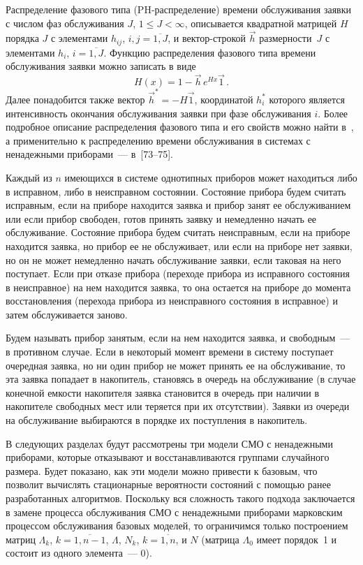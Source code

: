 \begin{multicols}{2}
Распределение фазового типа (PH-рас\-пре\-де\-ле\-ние) времени обслуживания
заявки с числом фаз обслуживания $J$, $1\le J <\infty$,
описывается квад\-рат\-ной матрицей $H$ порядка $J$ с элементами
$h_{ij}$,  $i,j=\overline{1,J}$, и вектор-строкой $\vec h$
размерности~$J$ с элементами $h_i$, $i=\overline{1,J}$.
Функцию распределения фазового типа
времени обслуживания заявки можно записать в виде
$$
H(x) = 1-\vec h\, e^{Hx} \vec1\,.
$$
Далее понадобится также вектор $\vec h^*= -H\vec1$, координатой
$h^*_i$ которого является интенсивность окончания обслуживания заявки
при фазе обслуживания $i$.
Более подробное описание распределения фазового типа и его свойств
можно найти в~\cite{BP95}, а применительно к распределению времени
обслуживания в системах с ненадежными приборами~--- в~[73--75].

Каждый из $n$ имеющихся в системе однотипных приборов может находиться
либо в исправном, либо в неисправном состоянии.
Состояние прибора будем считать исправным, если на приборе находится
заявка и прибор занят ее обслуживанием или если прибор свободен,
готов принять заявку и немедленно начать ее обслуживание.
Состояние прибора будем считать неисправным, если на приборе находится
заявка, но прибор ее не обслуживает, или если на приборе нет заявки,
но он не может немедленно начать обслуживание заявки, если таковая на него
поступает.
Если при отказе прибора (переходе прибора из исправного состояния в
неисправное) на нем находится заявка, то она остается на приборе до
момента восстановления (перехода прибора из неисправного состояния в
исправное) и затем обслуживается заново.

Будем называть прибор занятым, если на нем находится заявка, и
свободным~--- в противном случае.
Если в некоторый момент времени в систему поступает очередная заявка,
но ни один прибор не может принять ее на обслуживание, то эта заявка
попадает в накопитель, становясь в очередь на обслуживание (в случае
конечной емкости накопителя заявка становится в очередь при наличии
в накопителе свободных мест или теряется при их отсутствии).
Заявки из очереди на обслуживание выбираются в порядке их поступления
в накопитель.

В следующих разделах будут рассмотрены три модели СМО с ненадежными
приборами, которые отказывают и восстанавливаются группами случайного
размера.
Будет показано, как эти модели можно привести к базовым,
что позволит вычислять стационарные вероятности состояний с помощью
ранее разработанных алгоритмов.
Поскольку вся сложность такого подхода заключается в замене процесса
обслуживания СМО с ненадежными приборами марковским процессом
обслуживания базовых моделей, то ограничимся только
построением матриц $\Lambda_k$, $k=\overline{1,n-1}$,
$\Lambda$, $N_k$, $k=\overline{1,n}$, и $N$ (матрица $\Lambda_0$
имеет порядок~1 и состоит из одного элемента~--- 0).


\end{multicols}
